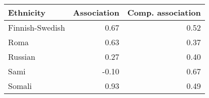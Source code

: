 \begin{tabular}{lrr}
\toprule
      Ethnicity &  Association &  Comp. association \\
\midrule
Finnish-Swedish &         0.67 &               0.52 \\
           Roma &         0.63 &               0.37 \\
        Russian &         0.27 &               0.40 \\
           Sami &        -0.10 &               0.67 \\
         Somali &         0.93 &               0.49 \\
\bottomrule
\end{tabular}
